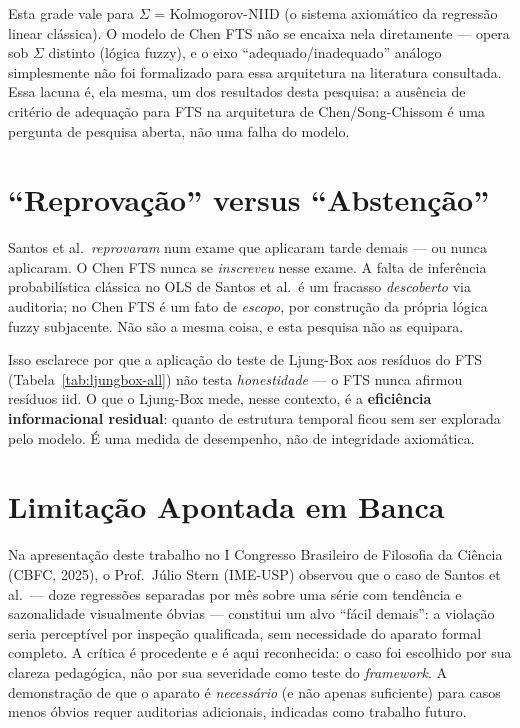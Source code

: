 \documentclass[
    12pt,
    oneside,
    openany,
    a4paper,
    english,
    brazil
]{abntex2}
\theoremstyle{definition}
\begin{document}
Esta grade vale para $\Sigma$ = Kolmogorov-NIID (o sistema axiomático da regressão linear clássica). O modelo de Chen FTS não se encaixa nela diretamente --- opera sob $\Sigma$ distinto (lógica fuzzy), e o eixo ``adequado/inadequado'' análogo simplesmente não foi formalizado para essa arquitetura na literatura consultada. Essa lacuna é, ela mesma, um dos resultados desta pesquisa: a ausência de critério de adequação para FTS na arquitetura de Chen/Song-Chissom é uma pergunta de pesquisa aberta, não uma falha do modelo.

\section{``Reprovação'' versus ``Abstenção''}
\label{sec:reprovacao}

Santos et al.\ \textit{reprovaram} num exame que aplicaram tarde demais --- ou nunca aplicaram. O Chen FTS nunca se \textit{inscreveu} nesse exame. A falta de inferência probabilística clássica no OLS de Santos et al.\ é um fracasso \textit{descoberto} via auditoria; no Chen FTS é um fato de \textit{escopo}, por construção da própria lógica fuzzy subjacente. Não são a mesma coisa, e esta pesquisa não as equipara.

Isso esclarece por que a aplicação do teste de Ljung-Box aos resíduos do FTS (Tabela~\ref{tab:ljungbox-all}) não testa \textit{honestidade} --- o FTS nunca afirmou resíduos iid. O que o Ljung-Box mede, nesse contexto, é a \textbf{eficiência informacional residual}: quanto de estrutura temporal ficou sem ser explorada pelo modelo. É uma medida de desempenho, não de integridade axiomática.

\section{Limitação Apontada em Banca}
\label{sec:limitacao-banca}

Na apresentação deste trabalho no I Congresso Brasileiro de Filosofia da Ciência (CBFC, 2025), o Prof.\ Júlio Stern (IME-USP) observou que o caso de Santos et al.\ --- doze regressões separadas por mês sobre uma série com tendência e sazonalidade visualmente óbvias --- constitui um alvo ``fácil demais'': a violação seria perceptível por inspeção qualificada, sem necessidade do aparato formal completo. A crítica é procedente e é aqui reconhecida: o caso foi escolhido por sua clareza pedagógica, não por sua severidade como teste do \textit{framework}. A demonstração de que o aparato é \textit{necessário} (e não apenas suficiente) para casos menos óbvios requer auditorias adicionais, indicadas como trabalho futuro.
\end{document}
